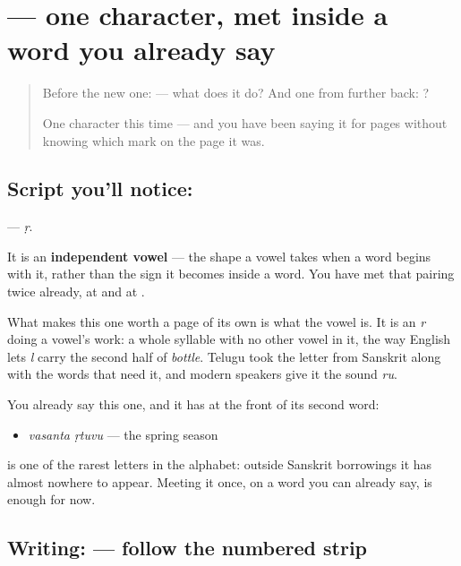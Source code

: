 \section[\texorpdfstring{\te{ఋ} (ṛ)}{ఋ (ṛ)}]{ — one character, met inside a word you already say}

\label{lesson:TE-S129-letter-vocalic-r}



\begin{quote}
Before the new one:  — what does it do? And one from further back: ?

One character this time — and you have been saying it for pages without knowing which mark on the page it was.
\end{quote}

\subsection*{Script you'll notice: }
\textbf{} — \emph{ṛ}.

It is an \textbf{independent vowel} — the shape a vowel takes when a word begins with it, rather than the sign it becomes inside a word. You have met that pairing twice already, at \textbf{} and at \textbf{}.

What makes this one worth a page of its own is what the vowel is. It is an \emph{r} doing a vowel's work: a whole syllable with no other vowel in it, the way English lets \emph{l} carry the second half of \emph{bottle}. Telugu took the letter from Sanskrit along with the words that need it, and modern speakers give it the sound \emph{ru}.

You already say this one, and it has  at the front of its second word:

\begin{itemize}
\raggedright
  \item \textbf{ } \emph{vasanta ṛtuvu} — the spring season
\end{itemize}

 is one of the rarest letters in the alphabet: outside Sanskrit borrowings it has almost nowhere to appear. Meeting it once, on a word you can already say, is enough for now.

\subsection*{Writing:  — follow the numbered strip}

